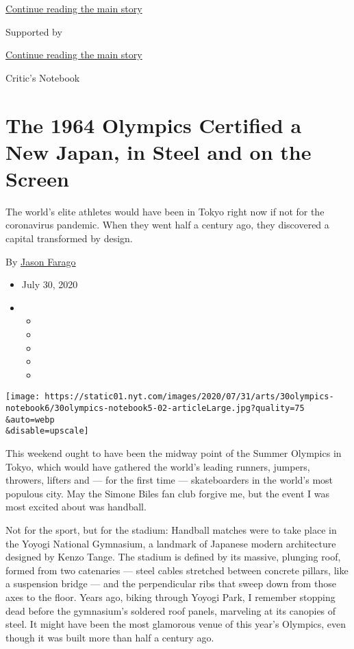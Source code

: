 \protect\hyperlink{after-top}{Continue reading the main story}

Supported by

\protect\hyperlink{after-sponsor}{Continue reading the main story}

Critic's Notebook

\hypertarget{the-1964-olympics-certified-a-new-japan-in-steel-and-on-the-screen}{%
\section{The 1964 Olympics Certified a New Japan, in Steel and on the
Screen}\label{the-1964-olympics-certified-a-new-japan-in-steel-and-on-the-screen}}

The world's elite athletes would have been in Tokyo right now if not for
the coronavirus pandemic. When they went half a century ago, they
discovered a capital transformed by design.

By \href{https://www.nytimes.com/by/jason-farago}{Jason Farago}

\begin{itemize}
\item
  July 30, 2020
\item
  \begin{itemize}
  \item
  \item
  \item
  \item
  \item
  \end{itemize}
\end{itemize}

\texttt{[image: https://static01.nyt.com/images/2020/07/31/arts/30olympics-notebook6/30olympics-notebook5-02-articleLarge.jpg?quality=75\\\&auto=webp\\\&disable=upscale]}

This weekend ought to have been the midway point of the Summer Olympics
in Tokyo, which would have gathered the world's leading runners,
jumpers, throwers, lifters and --- for the first time --- skateboarders
in the world's most populous city. May the Simone Biles fan club forgive
me, but the event I was most excited about was handball.

Not for the sport, but for the stadium: Handball matches were to take
place in the Yoyogi National Gymnasium, a landmark of Japanese modern
architecture designed by Kenzo Tange. The stadium is defined by its
massive, plunging roof, formed from two catenaries --- steel cables
stretched between concrete pillars, like a suspension bridge --- and the
perpendicular ribs that sweep down from those axes to the floor. Years
ago, biking through Yoyogi Park, I remember stopping dead before the
gymnasium's soldered roof panels, marveling at its canopies of steel. It
might have been the most glamorous venue of this year's Olympics, even
though it was built more than half a century ago.

